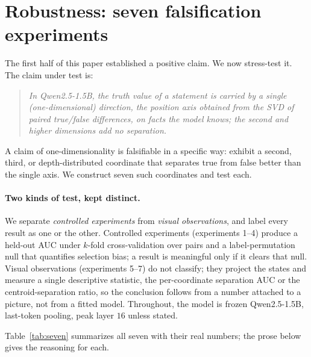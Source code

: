 \documentclass[11pt]{article}
\begin{document}
\section{Robustness: seven falsification experiments}
\label{sec:robust}

The first half of this paper established a positive claim. We now stress-test
it. The claim under test is:

\begin{quote}
\emph{In Qwen2.5-1.5B, the truth value of a statement is carried by a single
(one-dimensional) direction, the position axis obtained from the SVD of
paired true/false differences, on facts the model knows; the second and
higher dimensions add no separation.}
\end{quote}

A claim of one-dimensionality is falsifiable in a specific way: exhibit a
second, third, or depth-distributed coordinate that separates true from false
better than the single axis. We construct seven such coordinates and test
each.

\paragraph{Two kinds of test, kept distinct.} We separate \emph{controlled
experiments} from \emph{visual observations}, and label every result as one
or the other. Controlled experiments (experiments 1--4) produce a held-out
AUC under $k$-fold cross-validation over pairs and a label-permutation null
that quantifies selection bias; a result is meaningful only if it clears that
null. Visual observations (experiments 5--7) do not classify; they project
the states and measure a single descriptive statistic, the per-coordinate
separation AUC or the centroid-separation ratio, so the conclusion follows
from a number attached to a picture, not from a fitted model. Throughout, the
model is frozen Qwen2.5-1.5B, last-token pooling, peak layer $16$ unless
stated.

Table~\ref{tab:seven} summarizes all seven with their real numbers; the prose
below gives the reasoning for each.
\end{document}
